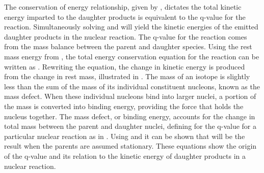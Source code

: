 \documentclass[../../../../main.tex]{subfiles}
\begin{document}
    The conservation of energy relationship, given by , dictates the total kinetic energy imparted to the daughter products is equivalent to the \gls{q-value} for the reaction.
    Simultaneously solving  and  will yield the kinetic energies of the emitted daughter products in the nuclear reaction.
    The \gls{q-value} for the reaction comes from the mass balance between the parent and daughter species.
    Using the rest mass energy from , the total energy conservation equation for the reaction can be written as .
    Rewriting the equation, the change in kinetic energy is produced from the change in rest mass, illustrated in .
    The mass of an isotope is slightly less than the sum of the mass of its individual constituent nucleons, known as the mass defect.
    When these individual nucleons bind into larger nuclei, a portion of the mass is converted into binding energy, providing the force that holds the nucleus together.
    The mass defect, or binding energy, accounts for the change in total mass between the parent and daughter nuclei, defining for the \gls{q-value} for a particular nuclear reaction as in .
    Using  and  it can be shown that  will be the result when the parents are assumed stationary.
    These equations show the origin of the \gls{q-value} and its relation to the kinetic energy of daughter products in a nuclear reaction.
\end{document}

